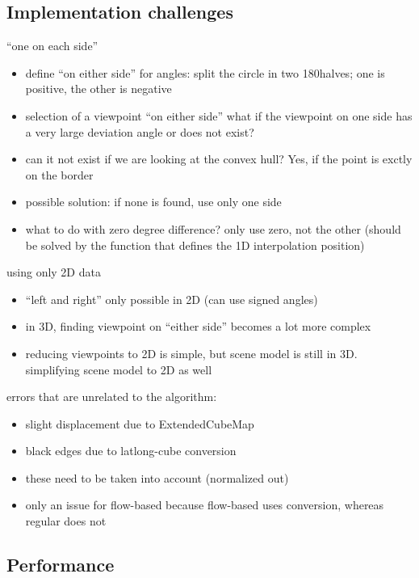 \subsection{Implementation challenges}
``one on each side''
\begin{itemize}
  \item define ``on either side'' for angles: split the circle in two 180\degree halves; one is positive, the other is negative
  \item selection of a viewpoint ``on either side'' \ar what if the viewpoint on one side has a very large deviation angle or does not exist?
  \item can it not exist if we are looking at the convex hull? Yes, if the point is exctly on the border
  \item possible solution: if none is found, use only one side
  \item what to do with zero degree difference? \ar only use zero, not the other (should be solved by the function that defines the 1D interpolation position)
\end{itemize}
using only 2D data
\begin{itemize}
  \item ``left and right'' only possible in 2D (can use signed angles)
  \item in 3D, finding viewpoint on ``either side'' becomes a lot more complex
  \item reducing viewpoints to 2D is simple, but scene model is still in 3D. simplifying scene model to 2D as well
\end{itemize}

errors that are unrelated to the algorithm:
\begin{itemize}
  \item slight displacement due to ExtendedCubeMap
  \item black edges due to latlong-cube conversion
  \item these need to be taken into account (normalized out)
  \item only an issue for flow-based because flow-based uses conversion, whereas regular does not
\end{itemize}

\subsection{Performance}
